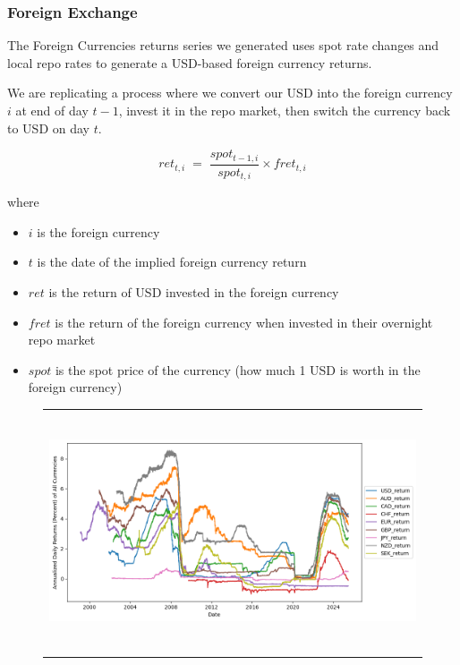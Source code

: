 \documentclass{article}
\begin{document}
\begin{appendices}
\subsubsection{Foreign Exchange}
\label{sec:fx}
The Foreign Currencies returns series we generated uses spot rate changes and local repo rates to generate a USD-based
foreign currency returns. 

We are replicating a process where we convert our USD into the foreign currency $i$ at end of day $t - 1$, 
invest it in the repo market, then switch the currency back to USD on day $t$. 

\begin{equation}
  ret_{t, i} \;=\; \frac{spot_{t - 1, i}}{spot_{t, i}} \times fret_{t, i}
\end{equation}

where
\begin{itemize}
 \item $i$ is the foreign currency
 \item $t$ is the date of the implied foreign currency return
 \item $ret$ is the return of USD invested in the foreign currency
 \item $fret$ is the return of the foreign currency when invested in their overnight repo market
 \item $spot$ is the spot price of the currency (how much 1 USD is worth in the foreign currency)
\end{itemize}

\begin{figure}
  \centering
  \begin{tabular}{@{}c@{}}
    \includegraphics[width=.7\linewidth,height=200pt,width=400pt]{../docs_src/FX_returns.png} \\[\abovecaptionskip]
  \end{tabular}


\end{figure}
\end{appendices}
\end{document}
